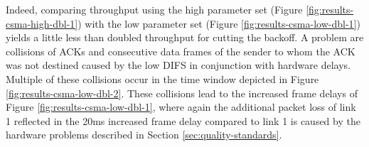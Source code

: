  Indeed, comparing throughput using the high parameter set (Figure \ref{fig:results-csma-high-dbl-1}) with the low parameter set (Figure \ref{fig:results-csma-low-dbl-1}) yields a little less than doubled throughput for cutting the backoff. 
 A problem are collisions of ACKs and consecutive data frames of the sender to whom the ACK was not destined caused by the low DIFS in conjunction with hardware delays. Multiple of these collisions occur in the time window depicted in Figure \ref{fig:results-csma-low-dbl-2}. These collisions lead to the increased frame delays of Figure \ref{fig:results-csma-low-dbl-1}, where again the additional packet loss of link 1 reflected in the 20ms increased frame delay compared to link 1 is caused by the hardware problems described in Section \ref{sec:quality-standards}.

